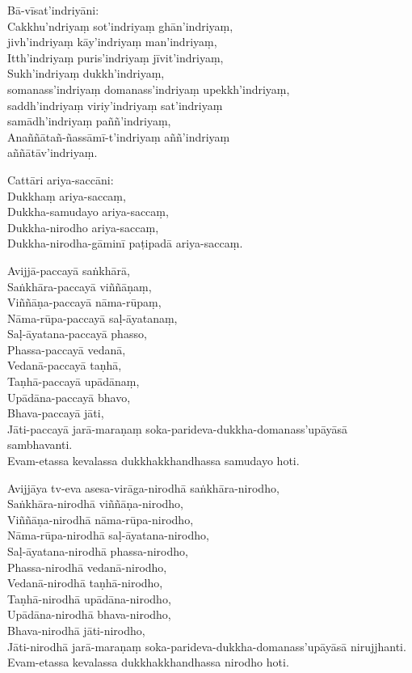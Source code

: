 Bā-vīsat'indriyāni:\\
Cakkhu'ndriyaṃ sot'indriyaṃ ghān'indriyaṃ,\\
jivh'indriyaṃ kāy'indriyaṃ man'indriyaṃ,\\
Itth'indriyaṃ puris'indriyaṃ jīvit'indriyaṃ,\\
Sukh'indriyaṃ dukkh'indriyaṃ,\\
somanass'indriyaṃ domanass'indriyaṃ upekkh'indriyaṃ,\\
saddh'indriyaṃ viriy'indriyaṃ sat'indriyaṃ\\
samādh'indriyaṃ paññ'indriyaṃ,\\
Anaññātañ-ñassāmī-t'indriyaṃ aññ'indriyaṃ\\
aññātāv'indriyaṃ.

Cattāri ariya-saccāni:\\
Dukkhaṃ ariya-saccaṃ,\\
Dukkha-samudayo ariya-saccaṃ,\\
Dukkha-nirodho ariya-saccaṃ,\\
Dukkha-nirodha-gāminī paṭipadā ariya-saccaṃ.

Avijjā-paccayā saṅkhārā,\\
Saṅkhāra-paccayā viññāṇaṃ,\\
Viññāṇa-paccayā nāma-rūpaṃ,\\
Nāma-rūpa-paccayā saḷ-āyatanaṃ,\\
Saḷ-āyatana-paccayā phasso,\\
Phassa-paccayā vedanā,\\
Vedanā-paccayā taṇhā,\\
Taṇhā-paccayā upādānaṃ,\\
Upādāna-paccayā bhavo,\\
Bhava-paccayā jāti,\\
Jāti-paccayā jarā-maraṇaṃ soka-parideva-dukkha-domanass'upāyāsā sambhavanti.\\
Evam-etassa kevalassa dukkhakkhandhassa samudayo hoti.

Avijjāya tv-eva asesa-virāga-nirodhā saṅkhāra-nirodho,\\
Saṅkhāra-nirodhā viññāṇa-nirodho,\\
Viññāṇa-nirodhā nāma-rūpa-nirodho,\\
Nāma-rūpa-nirodhā saḷ-āyatana-nirodho,\\
Saḷ-āyatana-nirodhā phassa-nirodho,\\
Phassa-nirodhā vedanā-nirodho,\\
Vedanā-nirodhā taṇhā-nirodho,\\
Taṇhā-nirodhā upādāna-nirodho,\\
Upādāna-nirodhā bhava-nirodho,\\
Bhava-nirodhā jāti-nirodho,\\
Jāti-nirodhā jarā-maraṇaṃ soka-parideva-dukkha-domanass'upāyāsā nirujjhanti.\\
Evam-etassa kevalassa dukkhakkhandhassa nirodho hoti.

